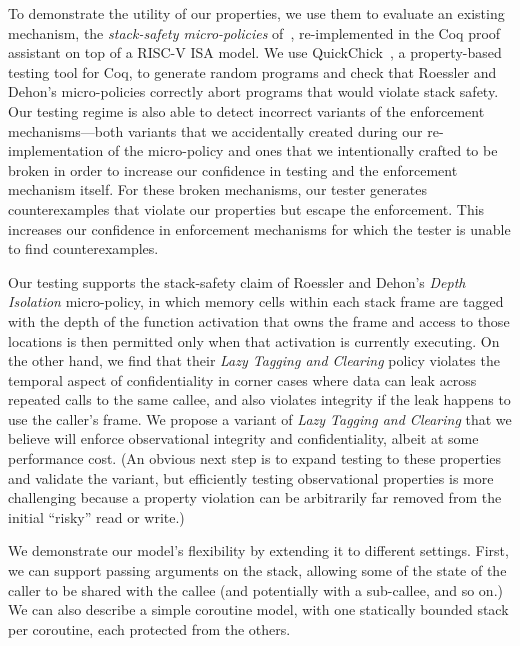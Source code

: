 \documentclass[acmtog,review,anonymous]{acmart}\settopmatter{printfolios=true,printccs=false,printacmref=false}
\begin{document}
To demonstrate the utility of our properties, we use them
to evaluate an existing mechanism, the
{\em stack-safety micro-policies} of~\citet{DBLP:conf/sp/RoesslerD18}, re-implemented
in the Coq proof assistant on top of a RISC-V ISA model. We
use QuickChick~\citep{Denes:VSL2014,Pierce:SF4}, a property-based testing
tool for Coq, to generate random programs and check
that Roessler and Dehon's micro-policies correctly abort programs that
would violate stack safety.
Our testing regime is also able to detect incorrect variants of the
enforcement mechanisms---both variants that we accidentally created
during our re-implementation of the micro-policy and ones that we
intentionally crafted to be broken in order to increase our confidence
in testing and the enforcement mechanism itself. For these broken
mechanisms, our tester
generates counterexamples that violate our properties but escape the
enforcement.  This increases our confidence in enforcement
mechanisms for which the tester is unable to find  counterexamples.

Our testing supports the stack-safety claim of Roessler and Dehon's {\em Depth
  Isolation} micro-policy, in
which memory cells within each stack frame are tagged with the depth of
the function activation that owns the frame and access to those locations is
then permitted only when that activation is currently executing.
On the other hand, we find that their \emph{Lazy Tagging and Clearing} policy
violates the temporal aspect of confidentiality in
corner cases where data can leak across repeated calls to the same callee,
and also violates integrity if the leak happens to use the caller's frame. We
propose a variant of {\em Lazy Tagging and Clearing} that
  we believe will enforce observational
integrity and confidentiality, albeit at some performance cost. (An obvious next step
is to expand testing to these properties and validate the variant, but
efficiently
testing observational properties is more challenging because a property
violation can be arbitrarily far removed from the initial ``risky'' read or
write.)

We demonstrate our model's flexibility by extending it to different settings.
First, we can support passing arguments on the stack, allowing some of the state of
the caller to be shared with the callee (and potentially with a sub-callee,
and so on.)  We can also describe a simple coroutine model, with one
statically bounded stack per coroutine, each protected from the others.
\end{document}
